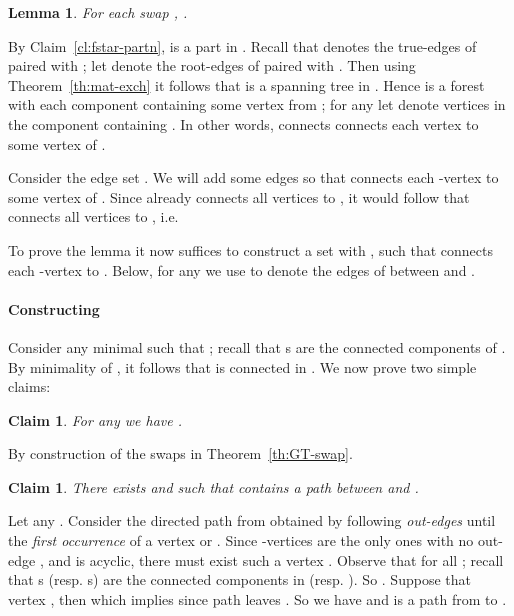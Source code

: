 \documentclass[11pt,twoside,a4paper]{article}
\newtheorem{lemma}[theorem]{Lemma}
\newtheorem{claim}[theorem]{Claim}
\newenvironment{proof}{

\noindent{\bf Proof:}} {\hfill


}
\begin{document}
\begin{lemma}\label{lem:kmf-main}
For each swap , .
\end{lemma}
\begin{proof}
By Claim~\ref{cl:fstar-partn},  is a part in . Recall that  denotes the true-edges of  paired
with ; let  denote the root-edges of  paired with . Then using Theorem~\ref{th:mat-exch} it follows that
 is a spanning tree in . Hence  is a forest
with each component containing some vertex from ; for any  let  denote vertices in the
component containing .
In other words,  connects connects each vertex to some vertex of .



Consider the edge set . We will add some edges  so that  connects
each -vertex to some vertex of . Since  already connects all vertices to , it would follow that
 connects all vertices to , i.e.

To prove the lemma it now suffices to construct a set  with , such that  connects each -vertex to . Below, for any  we use  to denote the edges of 
between  and .

\paragraph{Constructing } Consider any minimal  such that ; recall that s are
the connected components of . By minimality of , it follows that  is connected
in . We now prove two simple claims:



\begin{claim}\label{cl:tree-loc2} For any  we have .
\end{claim}
\begin{proof} By construction of the swaps \swap in Theorem~\ref{th:GT-swap}.
\end{proof}

\begin{claim}\label{cl:tree-loc3}
There exists  and  such that 
contains a path between  and .
\end{claim}
\begin{proof} Let any . Consider the directed path  from  obtained by following {\em out-edges } until the {\em first
occurrence} of  a vertex  or . Since -vertices are
the only ones with no out-edge , and  is acyclic, there must exist such a
vertex . Observe that  for
all ; recall that s (resp. s) are the connected components in  (resp. ). So
.
Suppose that vertex , then  which implies
 since path  leaves . So we
have  and  is a path from  to .
\end{proof}


\end{proof}
\end{document}
